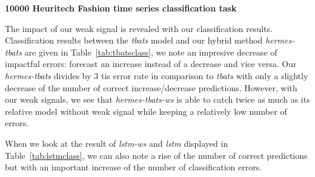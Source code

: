\documentclass{article} %
\begin{document}
\textbf{10000 Heuritech Fashion time series classification task}

 The impact of our weak signal is revealed with our classification results. Classification results between the \textit{tbats} model and our hybrid method \textit{hermes-tbats} are given in Table~\ref{tab:tbatsclass}, we note an impresive decrease of impactful errors: forecast an increase instead of a decrease and vice versa. Our \textit{hermes-tbats} divides  by 3 tis error rate in comparison to \textit{tbats} with only a slightly decrease of the number of correct increase/decrease predictions. However, with our weak signals, we see that \textit{hermes-tbats-ws} is able to catch twice as much as its relative model without weak signal while keeping a relatively low number of errors.

When we look at the result of \textit{lstm-ws} and \textit{lstm} displayed in Table~\ref{tab:lstmclass}, we can also note a rise of the number of correct predictions but with an important increase of the number of classification errors.

\end{document}
